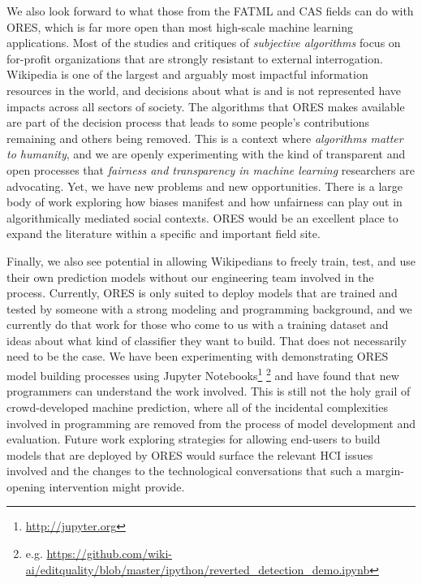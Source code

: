 We also look forward to what those from the FATML and CAS fields can do with ORES, which is far more open than most high-scale machine learning applications. Most of the studies and critiques of \emph{subjective algorithms}\cite{tufekci2015algorithms} focus on for-profit organizations that are strongly resistant to external interrogation. Wikipedia is one of the largest and arguably most impactful information resources in the world, and decisions about what is and is not represented have impacts across all sectors of society.  The algorithms that ORES makes available are part of the decision process that leads to some people's contributions remaining and others being removed.  This is a context where \emph{algorithms matter to humanity}, and we are openly experimenting with the kind of transparent and open processes that \emph{fairness and transparency in machine learning} researchers are advocating.  Yet, we have new problems and new opportunities.  There is a large body of work exploring how biases manifest and how unfairness can play out in algorithmically mediated social contexts.  ORES would be an excellent place to expand the literature within a specific and important field site.

Finally, we also see potential in allowing Wikipedians to freely train, test, and use their own prediction models without our engineering team involved in the process.  Currently, ORES is only suited to deploy models that are trained and tested by someone with a strong modeling and programming background, and we currently do that work for those who come to us with a training dataset and ideas about what kind of classifier they want to build.  That does not necessarily need to be the case.  We have been experimenting with demonstrating ORES model building processes using Jupyter Notebooks\footnote{\url{http://jupyter.org}} \footnote{e.g. \url{ https://github.com/wiki-ai/editquality/blob/master/ipython/reverted_detection_demo.ipynb}} and have found that new programmers can understand the work involved.  This is still not the holy grail of crowd-developed machine prediction, where all of the incidental complexities involved in programming are removed from the process of model development and evaluation.  Future work exploring strategies for allowing end-users to build models that are deployed by ORES would surface the relevant HCI issues involved and the changes to the technological conversations that such a margin-opening intervention might provide.
